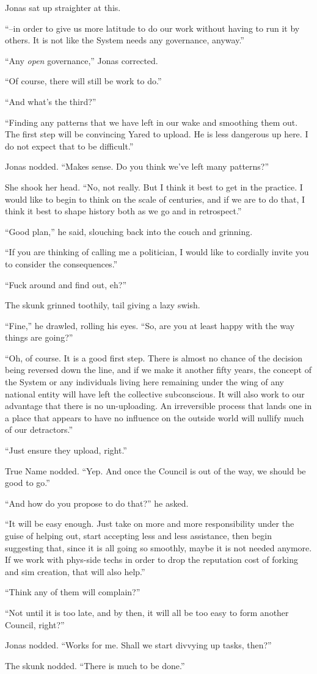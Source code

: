 Jonas sat up straighter at this.

``--in order to give us more latitude to do our work without having to run it by others. It is not like the System needs any governance, anyway.''

``Any \emph{open} governance,'' Jonas corrected.

``Of course, there will still be work to do.''

``And what's the third?''

``Finding any patterns that we have left in our wake and smoothing them out. The first step will be convincing Yared to upload. He is less dangerous up here. I do not expect that to be difficult.''

Jonas nodded. ``Makes sense. Do you think we've left many patterns?''

She shook her head. ``No, not really. But I think it best to get in the practice. I would like to begin to think on the scale of centuries, and if we are to do that, I think it best to shape history both as we go and in retrospect.''

``Good plan,'' he said, slouching back into the couch and grinning.

``If you are thinking of calling me a politician, I would like to cordially invite you to consider the consequences.''

``Fuck around and find out, eh?''

The skunk grinned toothily, tail giving a lazy swish.

``Fine,'' he drawled, rolling his eyes. ``So, are you at least happy with the way things are going?''

``Oh, of course. It is a good first step. There is almost no chance of the decision being reversed down the line, and if we make it another fifty years, the concept of the System or any individuals living here remaining under the wing of any national entity will have left the collective subconscious. It will also work to our advantage that there is no un-uploading. An irreversible process that lands one in a place that appears to have no influence on the outside world will nullify much of our detractors.''

``Just ensure they upload, right.''

True Name nodded. ``Yep. And once the Council is out of the way, we should be good to go.''

``And how do you propose to do that?'' he asked.

``It will be easy enough. Just take on more and more responsibility under the guise of helping out, start accepting less and less assistance, then begin suggesting that, since it is all going so smoothly, maybe it is not needed anymore. If we work with phys-side techs in order to drop the reputation cost of forking and sim creation, that will also help.''

``Think any of them will complain?''

``Not until it is too late, and by then, it will all be too easy to form another Council, right?''

Jonas nodded. ``Works for me. Shall we start divvying up tasks, then?''

The skunk nodded. ``There is much to be done.''
